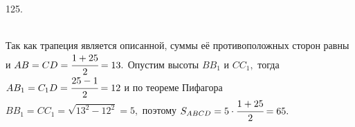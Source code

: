 125. \begin{figure}[ht!]
\end{figure}\\
Так как трапеция является описанной, суммы её противоположных сторон равны и $AB=CD=\cfrac{1+25}{2}=13.$ Опустим высоты $BB_1$ и $CC_1,$ тогда $AB_1=C_1D=\cfrac{25-1}{2}=12$ и по теореме Пифагора $BB_1=CC_1=\sqrt{13^2-12^2}=5,$ поэтому $S_{ABCD}=5\cdot\cfrac{1+25}{2}=65.$\newpage\noindent

